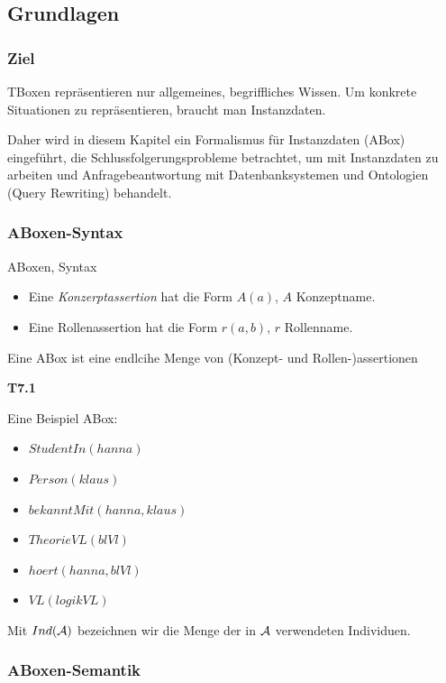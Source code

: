 \subsection{Grundlagen}

\subsubsection{Ziel}

TBoxen repräsentieren nur allgemeines, begriffliches Wissen. Um konkrete Situationen zu repräsentieren, braucht man Instanzdaten.

Daher wird in diesem Kapitel ein Formalismus für Instanzdaten (ABox) eingeführt, die Schlussfolgerungsprobleme betrachtet, um mit Instanzdaten zu arbeiten und Anfragebeantwortung mit Datenbanksystemen und Ontologien (Query Rewriting) behandelt.

\subsubsection{ABoxen-Syntax}

\begin{definition}{ABoxen, Syntax}

\begin{itemize}
	\item Eine \emph{Konzerptassertion} hat die Form $A(a)$, $A$ Konzeptname.
	\item Eine Rollenassertion hat die Form $r(a,b)$, $r$ Rollenname.
\end{itemize}

Eine ABox ist eine endlcihe Menge von (Konzept- und Rollen-)assertionen
\end{definition}

\textbf{T7.1}

Eine Beispiel ABox:

\begin{itemize}
	\item $StudentIn(hanna)$
	\item $Person(klaus)$
	\item $bekanntMit(hanna,klaus)$
	\item $TheorieVL(blVl)$
	\item $hoert(hanna, blVl)$
	\item $VL(logikVL)$
\end{itemize}

Mit $Ind(\mathcal{A})$ bezeichnen wir die Menge der in $\mathcal{A}$ verwendeten Individuen.

\subsubsection{ABoxen-Semantik}

